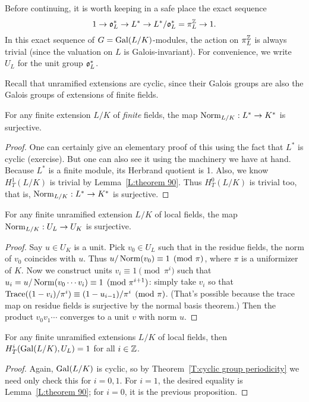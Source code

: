 Before continuing, it is worth keeping in a safe place the exact sequence
\[
1 \to \mathfrak{o}_L^* \to L^* \to L^*/\mathfrak{o}_L^* = \pi_L^{\mathbb{Z}} \to 1.
\]
In this exact sequence of $G
= \operatorname{Gal}(L/K)$-modules, the action on $\pi_L^{\mathbb{Z}}$ is always trivial
(since the valuation on $L$ is Galois-invariant). For convenience, we
write $U_L$ for the unit group $\mathfrak{o}_L^*$.

Recall that unramified extensions are cyclic, since their Galois groups are
also the Galois groups of extensions of finite fields. 

\begin{prop}
For any finite extension $L/K$ of \emph{finite} fields, the map
$\operatorname{Norm}_{L/K}: L^* \to K^*$ is surjective.
\end{prop}
\begin{proof}
One can certainly give an elementary proof of this using the fact that
$L^*$ is cyclic (exercise).
But one can also see it using the machinery we have at hand.
Because $L^*$ is a finite module, its Herbrand quotient is 1. Also,
we know $H^1_T(L/K)$ is trivial by Lemma~\ref{L:theorem 90}.
Thus $H^0_T(L/K)$ is trivial too, that is,
$\operatorname{Norm}_{L/K}: L^* \to K^*$ is surjective.
\end{proof}

\begin{prop}
For any finite unramified extension $L/K$ of local fields, the map
$\operatorname{Norm}_{L/K}: U_L \to U_K$ is surjective.
\end{prop}
\begin{proof}
Say $u \in U_K$ is a unit. Pick $v_0 \in U_L$ such that in the residue fields,
the norm of $v_0$ coincides with $u$. Thus $u/\operatorname{Norm}(v_0) \equiv 1 \pmod{\pi}$,
where $\pi$ is a uniformizer of $K$. Now we construct units
$v_i \equiv 1 \pmod{\pi^i}$ such that $u_i = u/\operatorname{Norm}(v_0\cdots v_i) \equiv 1 
\pmod{\pi^{i+1}}$: simply take $v_i$ so that 
$\operatorname{Trace}((1-v_i)/\pi^i) \equiv (1-u_{i-1})/\pi^i \pmod{\pi}$. (That's possible
because the trace map on residue fields is surjective by the normal basis theorem.)
Then the product $v_0v_1\cdots$ converges to a unit $v$ with norm $u$.
\end{proof}
\begin{cor}
For any finite unramified extensions $L/K$ of local fields, then
$H^i_T(\operatorname{Gal}(L/K), U_L) = 1$ for all $i \in \mathbb{Z}$.
\end{cor}
\begin{proof}
Again, $\operatorname{Gal}(L/K)$ is cyclic, so by Theorem~\ref{T:cyclic group periodicity}
we need only check this for $i=0,1$. For $i=1$, the desired equality is Lemma~\ref{L:theorem 90}; for $i=0$, it is the previous
proposition.  
\end{proof}

